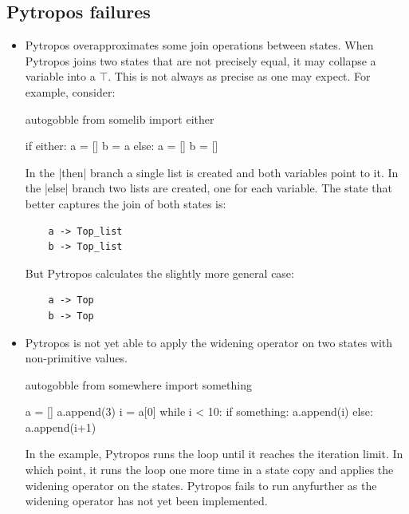 \subsection*{Pytropos failures}

\begin{itemize}

\item Pytropos overapproximates some join operations between states.
  When Pytropos joins two states that are not precisely equal, it may collapse a
  variable into a $\top$. This is not always as precise as one may expect. For example,
  consider:

  \begin{pythoncode*}{autogobble}
    from somelib import either

    if either:
        a = []
        b = a
    else:
        a = []
        b = []
  \end{pythoncode*}

  In the \pycode|then| branch a single list is created and both variables point to it.
  In the \pycode|else| branch two lists are created, one for each variable. The state that
  better captures the join of both states is:

  \begin{verbatim}
    a -> Top_list
    b -> Top_list
  \end{verbatim}

  But Pytropos calculates the slightly more general case:

  \begin{verbatim}
    a -> Top
    b -> Top
  \end{verbatim}

\item Pytropos is not yet able to apply the widening operator on two states with
  non-primitive values.

  \begin{pythoncode*}{autogobble}
     from somewhere import something

     a = []
     a.append(3)
     i = a[0]
     while i < 10:
         if something:
             a.append(i)
         else:
             a.append(i+1)
  \end{pythoncode*}

  In the example, Pytropos runs the loop until it reaches the iteration limit. In which
  point, it runs the loop one more time in a state copy and applies the widening operator
  on the states. Pytropos fails to run anyfurther as the widening operator has not yet
  been implemented.


\end{itemize}
